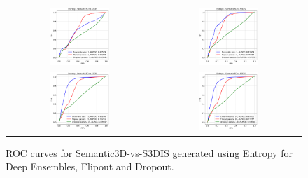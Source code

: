    \begin{figure}
        \centering
        \begin{tabular}{cc}
            \includegraphics[width = 0.42\textwidth, height= 0.3\textheight]{images/AUROC/Entropy_1.pdf} & 
            \includegraphics[width = 0.42\textwidth, height= 0.3\textheight]{images/AUROC/Entropy_5.pdf}\\ 
            
            \includegraphics[width = 0.42\textwidth, height= 0.3\textheight]{images/AUROC/Entropy_15.pdf} &
            \includegraphics[width = 0.42\textwidth, height= 0.3\textheight]{images/AUROC/Entropy_20.pdf} \\
        \end{tabular}
        \caption{ROC curves for Semantic3D-vs-S3DIS generated using Entropy for Deep Ensembles, Flipout and Dropout.}
        \label{fig:roc_ent_ood_1}
    \end{figure}

